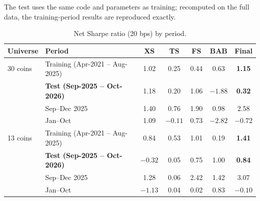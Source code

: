 \documentclass[aps,prl,onecolumn,superscriptaddress,nofootinbib]{revtex4-2}
\begin{document}
	The test uses the same code and parameters as training; recomputed on the full data, the training-period results are reproduced exactly.

	\begin{table}[!htbp]
		\caption{Net Sharpe ratio (20 bps) by period.}
		\label{tab:test}
		\begin{ruledtabular}
			\begin{tabular}{llccccc}
				Universe & Period & XS & TS & FS & BAB & \textbf{Final} \\
				\hline
				30 coins & Training (Apr-2021 -- Aug-2025) & 1.02 & 0.25 & 0.44 & 0.63 & \textbf{1.15} \\
				& \textbf{Test (Sep-2025 -- Oct-2026)} & 1.18 & 0.20 & 1.06 & $-1.88$ & \textbf{0.32} \\
				& \quad Sep--Dec 2025 & 1.40 & 0.76 & 1.90 & 0.98 & 2.58 \\
				& \quad 2026 Jan--Oct & 1.09 & $-0.11$ & 0.73 & $-2.82$ & $-0.72$ \\
				13 coins & Training (Apr-2021 -- Aug-2025) & 0.84 & 0.53 & 1.01 & 0.19 & \textbf{1.41} \\
				& \textbf{Test (Sep-2025 -- Oct-2026)} & $-0.32$ & 0.05 & 0.75 & 1.00 & \textbf{0.84} \\
				& \quad Sep--Dec 2025 & 1.28 & 0.06 & 2.42 & 1.42 & 3.07 \\
				& \quad 2026 Jan--Oct & $-1.13$ & 0.04 & 0.02 & 0.83 & $-0.10$ \\
			\end{tabular}
		\end{ruledtabular}
	\end{table}
\end{document}
